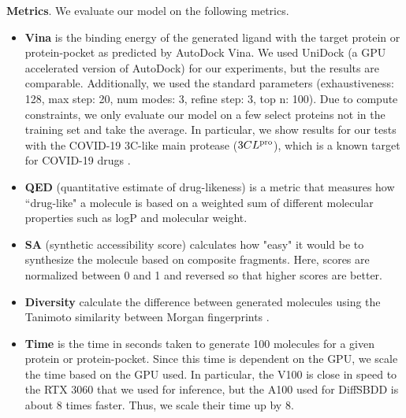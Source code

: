 \documentclass[11pt]{article}
\begin{document}
\textbf{Metrics}. We evaluate our model on the following metrics.
\begin{itemize}
\item \textbf{Vina} is the binding energy of the generated 
ligand with the target protein or protein-pocket as predicted by 
AutoDock Vina. We used UniDock \cite{Yu23} (a GPU accelerated version of AutoDock)
for our experiments, but the results are comparable. Additionally, we used the 
standard parameters (exhaustiveness: 128, max step: 20, num modes: 3, refine step: 3, top n: 100).
Due to 
compute constraints, we only evaluate our model on a few select 
proteins not in the training set and take the average. In particular,
we show results for our tests with the COVID-19 3C-like main protease ($3CL\textsuperscript{pro}$), which 
is a known target for COVID-19 drugs \cite{Zhu2020-be}.
\item \textbf{QED} \cite{Bickerton2012-vd}
(quantitative estimate of drug-likeness) is a metric that measures 
how ``drug-like" a molecule is based on a weighted sum of different 
molecular properties such as logP and molecular weight. 
\item \textbf{SA}
\cite{Ertl2009}
(synthetic accessibility score) calculates how "easy" it would be 
to synthesize the molecule based on composite fragments. Here, scores 
are normalized between 0 and 1 and reversed so that higher scores 
are better.
\item \textbf{Diversity} calculate the difference between generated molecules 
using the Tanimoto similarity between Morgan fingerprints \cite{Bajusz2015Dec}.
\item \textbf{Time} is the time in seconds taken to generate 100 molecules for a given 
protein or protein-pocket. Since this time is dependent on the GPU, we scale 
the time based on the GPU used. In particular, the V100 is close in speed to the 
RTX 3060 that we used for inference, but the A100 used for DiffSBDD is about 8 times 
faster. Thus, we scale their time up by 8.
\end{itemize}
\end{document}
